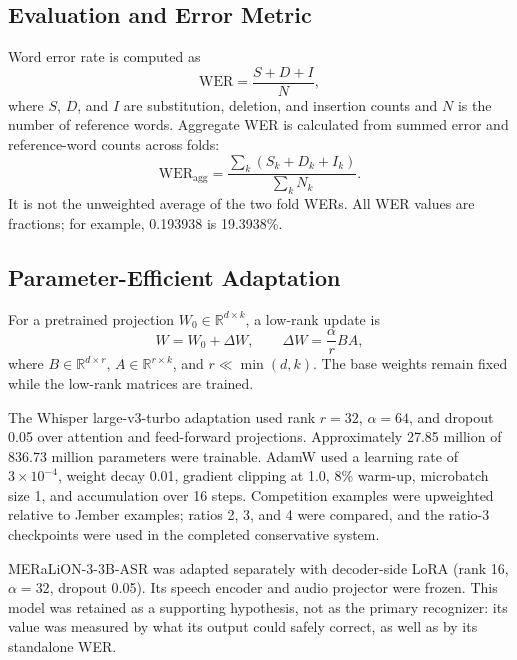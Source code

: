 \documentclass[journal]{IEEEtran}
\newcommand{\WER}{\mathrm{WER}}
\begin{document}
\subsection{Evaluation and Error Metric}
Word error rate is computed as
\begin{equation}
\WER = \frac{S + D + I}{N},
\label{eq:wer}
\end{equation}
where \(S\), \(D\), and \(I\) are substitution, deletion, and insertion counts and \(N\) is the number of reference words. Aggregate WER is calculated from summed error and reference-word counts across folds:
\begin{equation}
\WER_{\mathrm{agg}} =
\frac{\sum_{k}(S_k+D_k+I_k)}{\sum_{k}N_k}.
\label{eq:aggregate}
\end{equation}
It is not the unweighted average of the two fold WERs. All WER values are fractions; for example, 0.193938 is 19.3938\%.

\subsection{Parameter-Efficient Adaptation}
For a pretrained projection \(W_0 \in \mathbb{R}^{d \times k}\), a low-rank update is
\begin{equation}
W = W_0 + \Delta W,\qquad
\Delta W = \frac{\alpha}{r}BA,
\label{eq:lora}
\end{equation}
where \(B \in \mathbb{R}^{d \times r}\), \(A \in \mathbb{R}^{r \times k}\), and \(r \ll \min(d,k)\). The base weights remain fixed while the low-rank matrices are trained.

The Whisper large-v3-turbo adaptation used rank \(r=32\), \(\alpha=64\), and dropout 0.05 over attention and feed-forward projections. Approximately 27.85 million of 836.73 million parameters were trainable. AdamW used a learning rate of \(3\times10^{-4}\), weight decay 0.01, gradient clipping at 1.0, 8\% warm-up, microbatch size 1, and accumulation over 16 steps. Competition examples were upweighted relative to Jember examples; ratios 2, 3, and 4 were compared, and the ratio-3 checkpoints were used in the completed conservative system.

MERaLiON-3-3B-ASR was adapted separately with decoder-side LoRA (rank 16, \(\alpha=32\), dropout 0.05). Its speech encoder and audio projector were frozen. This model was retained as a supporting hypothesis, not as the primary recognizer: its value was measured by what its output could safely correct, as well as by its standalone WER.
\end{document}
